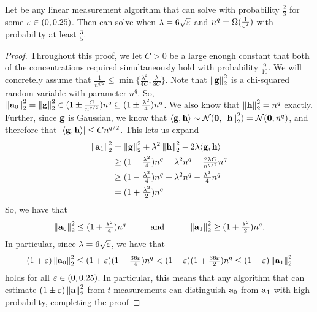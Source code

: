 \begin{lemma}
    Let \cA be any linear measurement algorithm that can solve  with probability \(\frac23\) for some \(\varepsilon \in (0,0.25)\).
    Then \cA can solve  when \(\lambda=6\sqrt{\varepsilon}\) and \(n^q = \Omega(\frac1{\varepsilon^2})\) with probability at least \(\frac35\).
\end{lemma}
\begin{proof}
    Throughout this proof, we let \(C>0\) be a large enough constant that both of the concentrations required simultaneously hold with probability \(\frac{9}{10}\).
    We will concretely assume that \(\frac{1}{n^{q/2}} \leq \min\{\frac{\lambda^2}{4C},\frac{\lambda}{8C}\}\).
    Note that \(\norm{\vg}_2^2\) is a chi-squared random variable with parameter \(n^q\).
    So, \(\norm{\va_0}_2^2 = \norm{\vg}_2^2 \in (1\pm\frac{C}{n^{q/2}})n^q \subseteq (1\pm\frac{\lambda^2}{4})n^q\).
    We also know that \(\norm{\vh}_2^2 = n^q\) exactly.
    Further, since \(\boldsymbol{\mathrm{g}}\) is Gaussian, we know that \(\langle \vg, \vh \rangle \sim \cN(\vec0,\norm{\vh}_2^2) = \cN(\vec0,n^q)\), and therefore that \(|\langle \boldsymbol{\mathrm{g}}, \boldsymbol{\mathrm{h}} \rangle| \leq C n^{q/2}\).
    This lets us expand
    \begin{align*}
    \norm{\va_1}_2^2
    &= \norm{\vg}_2^2 + \lambda^2\norm{\vh}_2^2 - 2\lambda\langle \vg, \vh\rangle \\
    &\geq (1-\tsfrac{\lambda^2}{4})n^q + \lambda^2n^q - \tsfrac{2\lambda C}{n^{q/2}}n^q \\
    &\geq (1-\tsfrac{\lambda^2}{4})n^q + \lambda^2n^q - \tsfrac{\lambda^2}{4}n^q \\
    &= (1+\tsfrac{\lambda^2}{2})n^q
    \end{align*}
    So, we have that
    \[
        \norm{\va_0}_2^2 \leq (1+\tsfrac{\lambda^2}{4}) n^q
        \hspace{1cm}
        \text{and}
        \hspace{1cm}
        \norm{\va_1}_2^2 \geq (1+\tsfrac{\lambda^2}{2}) n^q.
    \]
    In particular, since \(\lambda = 6\sqrt{\varepsilon}\), we have that
    \[
        (1+\eps)\norm{\va_0}_2^2
        \leq (1+\eps)(1+\tsfrac{36\eps}{4})n^q
        < (1-\eps)(1+\tsfrac{36\eps}{2})n^q
        \leq (1-\eps)\norm{\va_1}_2^2
    \]
    holds for all \(\varepsilon\in(0,0.25)\).
    In particular, this means that any algorithm \cA that can estimate \((1\pm\eps)\norm{\va}_2^2\) from \(t\) measurements can distinguish \(\boldsymbol{\mathrm{a}}_0\) from \(\boldsymbol{\mathrm{a}}_1\) with high probability, completing the proof
\end{proof}

